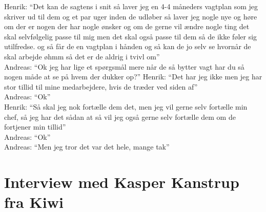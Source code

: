 Henrik: “Det kan de sagtens i snit så laver jeg en 4-4 måneders vagtplan som jeg skriver ud til dem og et par uger inden de udløber så laver jeg nogle nye og høre om der er nogen der har nogle ønsker og om de gerne vil ændre nogle ting det skal selvfølgelig passe til mig men det skal også passe til dem så de ikke føler sig utilfredse. og så får de en vagtplan i hånden og så kan de jo selv se hvornår de skal arbejde øhmm så det er de aldrig i tvivl om”\\
Andreas: “Ok jeg har lige et spørgsmål mere når de så bytter vagt har du så nogen måde at se på hvem der dukker op?”
Henrik: “Det har jeg ikke men jeg har stor tillid til mine medarbejdere, hvis de træder ved siden af”\\
Andreas: “Ok”\\
Henrik: “Så skal jeg nok fortælle dem det, men jeg vil gerne selv fortælle min chef, så jeg har det sådan at så vil jeg også gerne selv fortælle dem om de fortjener min tillid”\\
Andreas: “Ok”\\
Andreas: “Men jeg tror det var det hele, mange tak”\\


\section{Interview med Kasper Kanstrup fra Kiwi}\label{app:kiwi}

